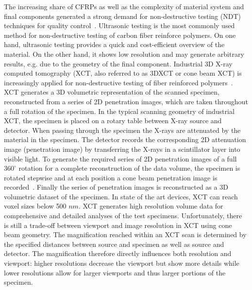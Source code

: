 The increasing share of CFRPs as well as the complexity of material system and final components generated a strong demand for non-destructive testing (NDT) techniques for quality control~\cite{Red2012}. Ultrasonic testing is the most commonly used method for non-destructive testing of carbon fiber reinforce polymers. On one hand, ultrasonic testing provides a quick and cost-efficient overview of the material. On the other hand, it shows low resolution and may generate arbitrary results, e.g. due to the geometry of the final component. Industrial 3D X-ray computed tomography (XCT, also referred to as 3DXCT or cone beam XCT) is increasingly applied for non-destructive testing of fiber reinforced polymers~\cite{Kastner2012}. XCT generates a 3D volumetric representation of the scanned specimen, reconstructed from a series of 2D penetration images, which are taken throughout a full rotation of the specimen. In the typical scanning geometry of industrial XCT, the specimen is placed on a rotary table between X-ray source and detector. When passing through the specimen the X-rays are attenuated by the material in the specimen. The detector records the corresponding 2D attenuation image (penetration image) by transferring the X-rays in a scintillator layer into visible light. To generate the required series of 2D penetration images of a full $360^\circ$ rotation for a complete reconstruction of the data volume, the specimen is rotated stepwise and at each position a cone beam penetration image is recorded~\cite{heinzl-2008-thesis}. Finally the series of penetration images is  reconstructed as a 3D volumetric dataset of the specimen. 
In state of the art devices, XCT can reach voxel sizes below 500 $nm$. XCT generates high resolution volume data for comprehensive and detailed analyses of the test specimens. Unfortunately, there is still a trade-off between viewport and image resolution in XCT using cone beam geometry. The magnification reached within an XCT scan is determined by the specified distances between source and specimen as well as source and detector. The magnification therefore directly influences both resolution and viewport: higher resolutions decrease the viewport but show more details while lower resolutions allow for larger viewports and thus larger portions of the specimen.

